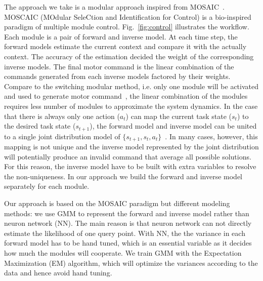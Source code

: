 

The approach we take is a modular approach inspired from MOSAIC~\cite{haruno2001mosaic}. MOSCAIC (MOdular SeleCtion and Identification for Control) is a bio-inspired paradigm of multiple module control. Fig.~\ref{fig:control} illustrates the workflow. Each module is a pair of forward and inverse model. At each time step, the forward models estimate the current context and compare it with the actually context. The accuracy of the estimation decided the weight of the corresponding inverse models.
The final motor command is the linear combination of the commands generated from each inverse models factored by their weights. Compare to the switching modular method, i.e. only one module will be activated and used to generate motor command~\cite{narendra1997adaptive}, the linear combination of the modules requires less number of modules to approximate the system dynamics. In the case that there is always only one action ($a_t$) can map the current task state ($s_t$) to the desired task state ($s_{t+1}$), the forward model and inverse model can be united to a single joint distribution model of $\{s_{t+1}, s_t, a_t\}$~\cite{petkos2006learning}. In many cases, however, this mapping is not unique and the inverse model represented by the joint distribution will potentially produce an invalid command that average all possible solutions. For this reason, the inverse model have to be built with extra variables to resolve the non-uniqueness. In our approach we build the forward and inverse model separately for each module.

Our approach is based on the MOSAIC paradigm but different modeling methods: we use GMM to represent the forward and inverse model rather than neuron network (NN). The main reason is that neuron network can not directly estimate the likelihood of one query point. With NN, the the variance in each forward model has to be hand tuned, which is an essential variable as it decides how much the modules will cooperate. We train GMM with the Expectation Maximization (EM) algorithm, which will optimize the variances according to the data and hence avoid hand tuning.

